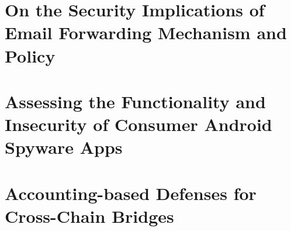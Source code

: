 \documentclass[12pt]{ucsddissertation}
\begin{document}
\tableofcontents
\listoffigures
\listoftables







\mainmatter





\chapter{On the Security Implications of Email Forwarding Mechanism and Policy}
\label{chap:eurosp23}









\chapter{Assessing the Functionality and Insecurity of Consumer Android Spyware Apps}
\label{chap:pets23}









\chapter{Accounting-based Defenses for Cross-Chain Bridges}
\label{chap:bridge}


















\appendix



\backmatter
\end{document}
